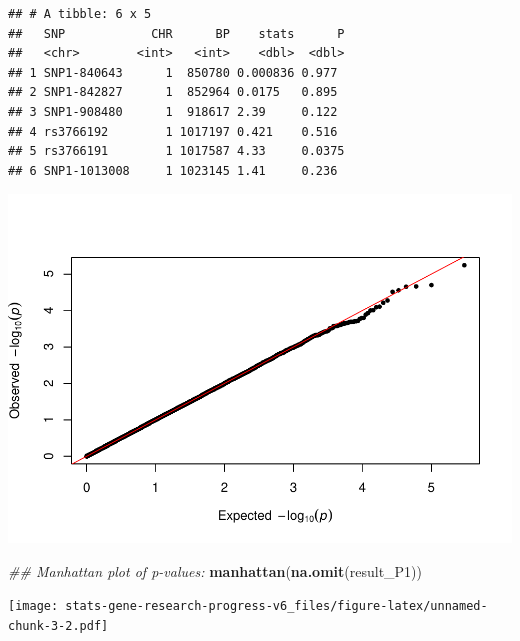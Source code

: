\documentclass[
]{article}
\newenvironment{Shaded}{\begin{snugshade}}{\end{snugshade}}
\newcommand{\CommentTok}[1]{\textcolor[rgb]{0.56,0.35,0.01}{\textit{#1}}}
\newcommand{\DataTypeTok}[1]{\textcolor[rgb]{0.13,0.29,0.53}{#1}}
\newcommand{\DecValTok}[1]{\textcolor[rgb]{0.00,0.00,0.81}{#1}}
\newcommand{\KeywordTok}[1]{\textcolor[rgb]{0.13,0.29,0.53}{\textbf{#1}}}
\newcommand{\NormalTok}[1]{#1}
\newcommand{\OperatorTok}[1]{\textcolor[rgb]{0.81,0.36,0.00}{\textbf{#1}}}
\begin{document}
\begin{verbatim}
## # A tibble: 6 x 5
##   SNP            CHR      BP    stats      P
##   <chr>        <int>   <int>    <dbl>  <dbl>
## 1 SNP1-840643      1  850780 0.000836 0.977 
## 2 SNP1-842827      1  852964 0.0175   0.895 
## 3 SNP1-908480      1  918617 2.39     0.122 
## 4 rs3766192        1 1017197 0.421    0.516 
## 5 rs3766191        1 1017587 4.33     0.0375
## 6 SNP1-1013008     1 1023145 1.41     0.236
\end{verbatim}

\begin{Shaded}
\end{Shaded}

\includegraphics{stats-gene-research-progress-v6_files/figure-latex/unnamed-chunk-3-1.pdf}

\begin{Shaded}
\begin{Highlighting}[]
\CommentTok{## Manhattan plot of p-values:}
\KeywordTok{manhattan}\NormalTok{(}\KeywordTok{na.omit}\NormalTok{(result_P1))}
\end{Highlighting}
\end{Shaded}

\texttt{[image: stats-gene-research-progress-v6\_files/figure-latex/unnamed-chunk-3-2.pdf]}

\begin{Shaded}
\end{Shaded}
\end{document}
